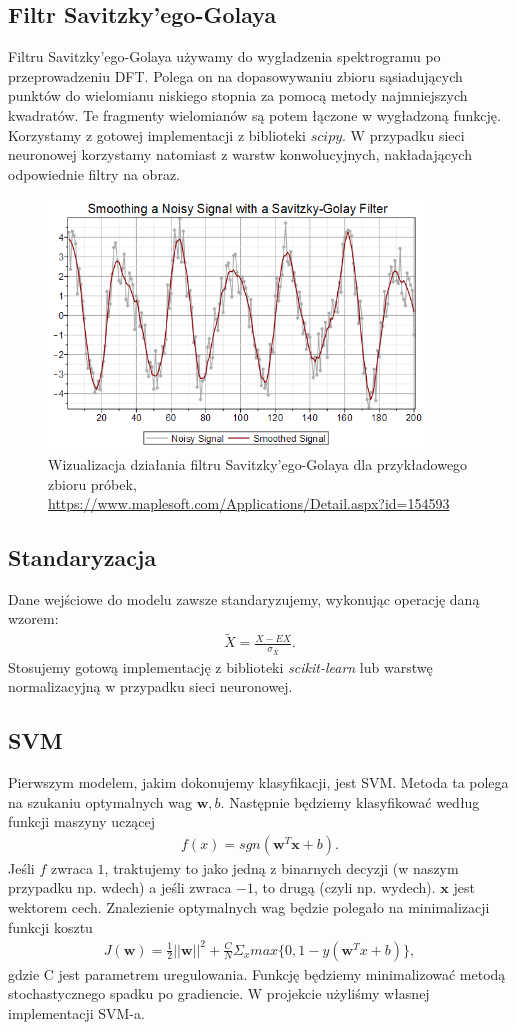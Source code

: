 \documentclass[polish]{article}
\begin{document}
\subsection{Filtr Savitzky'ego-Golaya}
Filtru Savitzky'ego-Golaya używamy do wygładzenia spektrogramu po przeprowadzeniu DFT.  Polega on na dopasowywaniu zbioru sąsiadujących punktów do wielomianu niskiego stopnia za pomocą metody najmniejszych kwadratów.
Te fragmenty wielomianów są potem łączone w wygładzoną funkcję. Korzystamy z gotowej implementacji
z biblioteki $scipy$. W przypadku sieci neuronowej korzystamy natomiast z warstw konwolucyjnych, nakładających odpowiednie filtry na obraz.
\begin{figure}[H]
	\centering
	\includegraphics[width=10cm]{savitzky_golay_filter}
	\caption{Wizualizacja działania filtru Savitzky'ego-Golaya dla przykładowego zbioru próbek, \url{https://www.maplesoft.com/Applications/Detail.aspx?id=154593}}
\end{figure}

\subsection{Standaryzacja}
Dane wejściowe do modelu zawsze standaryzujemy, wykonując operację daną wzorem:
\begin{gather*}
	\tilde X = \frac{X - EX}{\sigma_X}.
\end{gather*}
Stosujemy gotową implementację z biblioteki \textit{scikit-learn} lub warstwę normalizacyjną w przypadku sieci neuronowej.
\subsection{SVM}
Pierwszym modelem, jakim dokonujemy klasyfikacji, jest SVM. Metoda ta polega na szukaniu optymalnych wag $\boldsymbol{w}, b$.
Następnie będziemy klasyfikować według funkcji maszyny uczącej 
\begin{gather*}
	f(x) = sgn(\boldsymbol{w}^T \boldsymbol{x} + b).
\end{gather*}
Jeśli $f$ zwraca $1$, traktujemy to jako jedną z binarnych decyzji (w naszym przypadku np. wdech) a jeśli zwraca $-1$, to drugą (czyli np. wydech).
$\textbf{x}$ jest wektorem cech.  Znalezienie optymalnych wag będzie polegało na minimalizacji
funkcji kosztu
\begin{gather*}
	J(\boldsymbol{w}) = \frac{1}{2}||\boldsymbol{w}||^2 + \frac{C}{N}\Sigma_x max\{0, 1 - y(\boldsymbol{w}^Tx + b)\},
\end{gather*}
gdzie C jest parametrem uregulowania. Funkcję będziemy minimalizować metodą stochastycznego spadku po gradiencie.
W projekcie użyliśmy własnej implementacji SVM-a.
\end{document}
